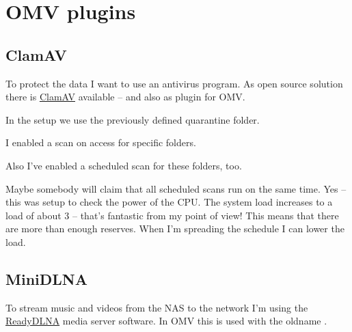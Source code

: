 \section{OMV plugins}

\subsection{ClamAV}\label{subsec:ClamAV}

To protect the data I want to use an antivirus program. As open source solution
there is \href{https://www.clamav.net}{ClamAV} available -- and also as plugin
for \gls{OMV}.


In the setup we use the previously defined quarantine folder.


I enabled a scan on access for specific folders.


Also I've enabled a scheduled scan for these folders, too.


Maybe somebody will claim that all scheduled scans run on the same time.\linebreak
Yes -- this was setup to check the power of the CPU. The system load increases
to a load of about 3 -- that's fantastic from my point of view! This means that
there are more than enough reserves. When I'm spreading the schedule I can
lower the load.


\subsection{MiniDLNA}

To stream music and videos from the \gls{NAS} to the network I'm using the
\href{https://sourceforge.net/projects/minidlna/}{ReadyDLNA} media server
software. In \gls{OMV} this is used with the oldname .


